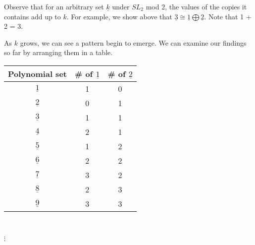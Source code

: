 \documentclass[a4paper,draft]{amsproc}
\theoremstyle{plain}
\theoremstyle{definition}
\theoremstyle{remark}
\numberwithin{equation}{section}
\begin{document}
Observe that for an arbitrary set $\underline{k}$ under $SL_{2}$ mod $2$, the values of the copies it contains add up to $k$. For example, we show above that $\underline{3} \cong \underline{1} \bigoplus \underline{2}$. Note that 1 + 2 = 3. 

As $k$ grows, we can see a pattern begin to emerge. We can examine our findings so far by arranging them in a table. 

\begin{table}[h]
    \begin{tabular}{|c|c|c|} 
	\hline
    Polynomial set & \# of $\underline{1}$ & \# of $\underline{2}$ \\ \hline
    $\underline{1}$ & 1 & 0 \\ \hline
    $\underline{2}$ & 0 & 1 \\ \hline
    $\underline{3}$ & 1 & 1 \\ \hline
    $\underline{4}$ & 2 & 1 \\ \hline
    $\underline{5}$ & 1 & 2 \\ \hline
    $\underline{6}$ & 2 & 2 \\ \hline
    $\underline{7}$ & 3 & 2 \\ \hline
    $\underline{8}$ & 2 & 3 \\ \hline
    $\underline{9}$ & 3 & 3 \\ \hline
    \end{tabular} \\
\begin{centering}$\vdots$\end{centering}
\end{table} 
\end{document}
